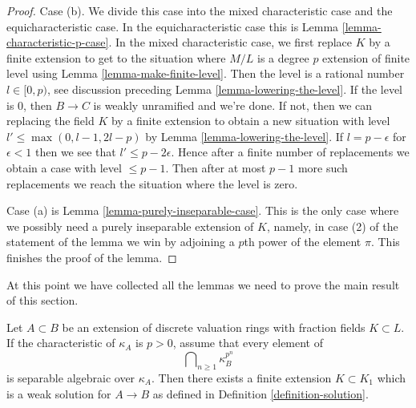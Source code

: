 \begin{proof}
\medskip\noindent
Case (b). We divide this case into the mixed characteristic case and the
equicharacteristic case. In the equicharacteristic case this is
Lemma \ref{lemma-characteristic-p-case}. In the mixed characteristic
case, we first replace $K$ by a finite extension to get to the
situation where $M/L$ is a degree $p$ extension of finite level using
Lemma \ref{lemma-make-finite-level}.
Then the level is a rational number $l \in [0, p)$, see discussion
preceding Lemma \ref{lemma-lowering-the-level}. If the level is $0$,
then $B \to C$ is weakly unramified and we're done. If not, then we
can replacing the field $K$ by a finite extension to obtain a new
situation with level $l' \leq \max(0, l - 1, 2l - p)$ by
Lemma \ref{lemma-lowering-the-level}.
If $l = p - \epsilon$ for $\epsilon < 1$ then we see that
$l' \leq p - 2\epsilon$. Hence after a finite number of replacements
we obtain a case with level $\leq p - 1$. Then after at most $p - 1$
more such replacements we reach the situation where the level is zero.

\medskip\noindent
Case (a) is Lemma \ref{lemma-purely-inseparable-case}. This is the only case
where we possibly need a purely inseparable extension of $K$, namely, in
case (2) of the statement of the lemma we win by adjoining a $p$th power
of the element $\pi$. This finishes the proof of the lemma.
\end{proof}

\noindent
At this point we have collected all the lemmas we need to prove the
main result of this section.

\begin{theorem}[Epp]
\label{theorem-epp}
Let $A \subset B$ be an extension of discrete valuation rings with fraction
fields $K \subset L$. If the characteristic of $\kappa_A$ is $p > 0$,
assume that every element of
$$
\bigcap\nolimits_{n \geq 1} \kappa_B^{p^n}
$$
is separable algebraic over $\kappa_A$. Then there exists a finite extension
$K \subset K_1$ which is a weak solution for $A \to B$ as defined in
Definition \ref{definition-solution}.
\end{theorem}

